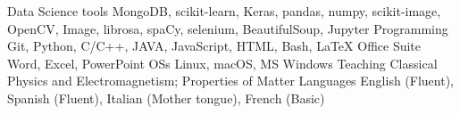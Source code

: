 

\begin{cvskills}
  \cvskill
    {Data Science tools}
    {MongoDB, scikit-learn, Keras, pandas, numpy, scikit-image, OpenCV, Image, librosa, spaCy, selenium, BeautifulSoup, Jupyter}
  \cvskill
    {Programming} %
    {Git, Python, C/C++, JAVA, JavaScript, HTML, Bash, LaTeX} %
  \cvskill
    {Office Suite}
    {Word, Excel, PowerPoint}
  \cvskill
    {OSs}
    {Linux, macOS, MS Windows}
  \cvskill
    {Teaching}
    {Classical Physics and Electromagnetism; Properties of Matter}
  \cvskill
    {Languages} %
    {English (Fluent), Spanish (Fluent), Italian (Mother tongue), French (Basic)} %
\end{cvskills}
